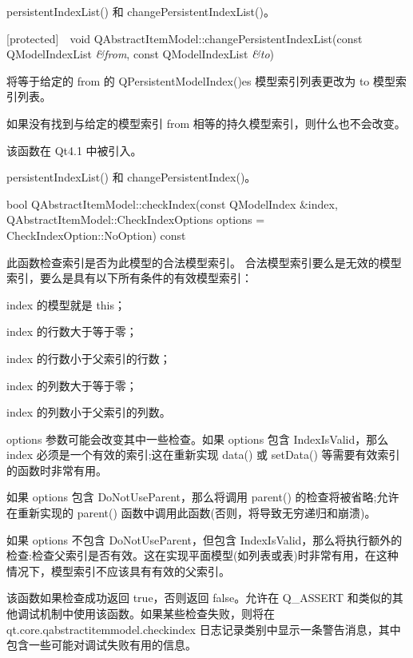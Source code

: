 \begin{seeAlso}
persistentIndexList() 和 changePersistentIndexList()。
\end{seeAlso}

[protected] void QAbstractItemModel::changePersistentIndexList(const QModelIndexList \emph{\&from}, const QModelIndexList \emph{\&to})

将等于给定的 from 的 QPersistentModelIndex()es 模型索引列表更改为 to 模型索引列表。

如果没有找到与给定的模型索引 from 相等的持久模型索引，则什么也不会改变。

该函数在 Qt4.1 中被引入。

\begin{seeAlso}
persistentIndexList() 和 changePersistentIndex()。
\end{seeAlso}
  
bool QAbstractItemModel::checkIndex(const QModelIndex \&index, QAbstractItemModel::CheckIndexOptions options = CheckIndexOption::NoOption) const

此函数检查索引是否为此模型的合法模型索引。 合法模型索引要么是无效的模型索引，要么是具有以下所有条件的有效模型索引：

\begin{compactitem}[\arr]
\item index 的模型就是 this；
\item index 的行数大于等于零；
\item index 的行数小于父索引的行数；
\item index 的列数大于等于零；
\item index 的列数小于父索引的列数。
\end{compactitem}

options 参数可能会改变其中一些检查。如果 options 包含 IndexIsValid，那么 index 必须是一个有效的索引;这在重新实现 data() 或 setData() 等需要有效索引的函数时非常有用。

如果 options 包含 DoNotUseParent，那么将调用 parent() 的检查将被省略;允许在重新实现的 parent() 函数中调用此函数(否则，将导致无穷递归和崩溃)。

如果 options 不包含 DoNotUseParent，但包含 IndexIsValid，那么将执行额外的检查:检查父索引是否有效。这在实现平面模型(如列表或表)时非常有用，在这种情况下，模型索引不应该具有有效的父索引。

该函数如果检查成功返回 true，否则返回 false。允许在 Q\_ASSERT 和类似的其他调试机制中使用该函数。如果某些检查失败，则将在 qt.core.qabstractitemmodel.checkindex 日志记录类别中显示一条警告消息，其中包含一些可能对调试失败有用的信息。

